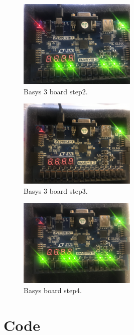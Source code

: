 \documentclass[11pt]{article}
\newcommand{\Verilog}[2][]{%
	
}
\begin{document}
\begin{figure}[ht]\centering
	\includegraphics[width=0.5\textwidth]{secondstep}
	\caption{Basys 3 board step2.}
	\label{fig:step 2 of board}
\end{figure}

\begin{figure}[ht]\centering
	\includegraphics[width=0.5\textwidth]{thirdstep}
	\caption{Basys 3 board step3.}
	\label{fig:step 3 of board}
\end{figure}

\begin{figure}[ht]\centering
	\includegraphics[width=0.5\textwidth]{laststep}
	\caption{Basys board step4.}
	\label{fig:step 4 of board}
\end{figure}

\clearpage
\section*{Code}
\Verilog[firstline=22, lastline=38, caption=register module source file,
label=code:file_ex_lines]{register.sv}

\Verilog[firstline=22, lastline=48, caption=ALU module source file,
label=code:file_ex_lines]{alu.sv}

\Verilog[firstline=22, lastline=40, caption=Top level source file,
label=code:file_ex_lines]{top_lab9.sv}

\Verilog[firstline=22, lastline=48, caption=register module testbench,
label=code:file_ex_lines]{register_test.sv}

\Verilog[firstline=1, lastline=20, caption=ALU module testbench,
label=code:file_ex_lines]{alu_test.sv}
\end{document}
